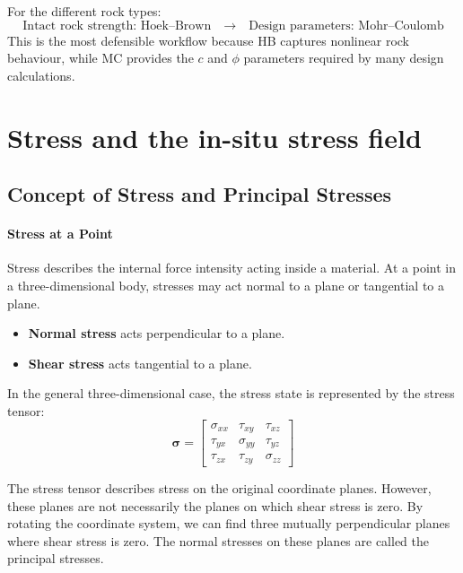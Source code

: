 \begin{keybox}
For the different rock types:
\[
\text{Intact rock strength: Hoek--Brown}
\quad \rightarrow \quad
\text{Design parameters: Mohr--Coulomb}
\]
This is the most defensible workflow because HB captures nonlinear rock behaviour, while
MC provides the \(c\) and \(\phi\) parameters required by many design calculations.
\end{keybox}

\section{Stress and the in-situ stress field}
\label{sec:stress-and-the-in-situ-stress-field}

\subsection{Concept of Stress and Principal Stresses}

\paragraph{Stress at a Point}

Stress describes the internal force intensity acting inside a material. At a point in a
three-dimensional body, stresses may act normal to a plane or tangential to a plane.

\begin{itemize}
 \item \textbf{Normal stress} acts perpendicular to a plane.
 \item \textbf{Shear stress} acts tangential to a plane.
\end{itemize}

In the general three-dimensional case, the stress state is represented by the stress tensor:
\[
\boldsymbol{\sigma}
=
\begin{bmatrix}
\sigma_{xx} & \tau_{xy} & \tau_{xz} \\
\tau_{yx} & \sigma_{yy} & \tau_{yz} \\
\tau_{zx} & \tau_{zy} & \sigma_{zz}
\end{bmatrix}
\]

\begin{notebox}
The stress tensor describes stress on the original coordinate planes. However, these
planes are not necessarily the planes on which shear stress is zero. By rotating the
coordinate system, we can find three mutually perpendicular planes where shear stress is
zero. The normal stresses on these planes are called the principal stresses.
\end{notebox}

